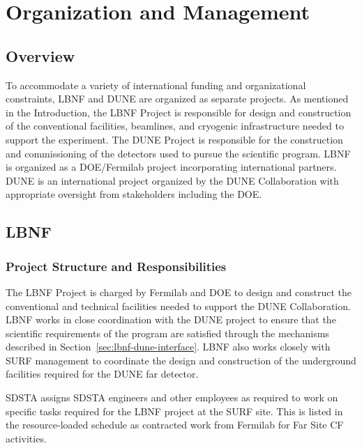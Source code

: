 \chapter{Organization and Management}
\label{v1ch:org-mgmt}

\section{Overview}

To accommodate a variety of international funding and organizational constraints, LBNF and DUNE are organized as separate projects. As mentioned in the Introduction, the LBNF Project is responsible for design and construction of the conventional facilities, beamlines, and cryogenic infrastructure needed to support the experiment.  The DUNE Project is responsible for the construction and commissioning of the detectors used to pursue the scientific program.  LBNF is organized as a DOE/Fermilab project incorporating international partners.   DUNE is an international project organized by the DUNE Collaboration with appropriate oversight from stakeholders including the DOE.

\section{LBNF}

\subsection{Project Structure and Responsibilities}

The LBNF Project is charged by Fermilab and DOE to design and construct the conventional and technical facilities needed to support the DUNE Collaboration.  LBNF works in close coordination with the DUNE project to ensure that the scientific requirements of the program are satisfied through the mechanisms described in Section~\ref{sec:lbnf-dune-interface}. LBNF also works closely with SURF management to coordinate the design and construction of the underground facilities required for the DUNE far detector. 

SDSTA assigns SDSTA engineers and other employees as required to work on specific tasks required for the LBNF project at the SURF site. This is listed in the resource-loaded schedule as contracted work from Fermilab for Far Site CF activities.  


